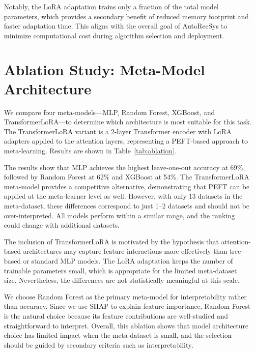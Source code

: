 \documentclass[conference]{IEEEtran}
\begin{document}
Notably, the LoRA adaptation trains only a fraction of the total model parameters, which provides a secondary benefit of reduced memory footprint and faster adaptation time. This aligns with the overall goal of AutoRecSys to minimize computational cost during algorithm selection and deployment.

\section{Ablation Study: Meta-Model Architecture}

We compare four meta-models---MLP, Random Forest, XGBoost, and TransformerLoRA---to determine which architecture is most suitable for this task. The TransformerLoRA variant is a 2-layer Transformer encoder with LoRA adapters \cite{hu2022lora} applied to the attention layers, representing a PEFT-based approach to meta-learning. Results are shown in Table~\ref{tab:ablation}.



The results show that MLP achieves the highest leave-one-out accuracy at 69\%, followed by Random Forest at 62\% and XGBoost at 54\%. The TransformerLoRA meta-model provides a competitive alternative, demonstrating that PEFT can be applied at the meta-learner level as well. However, with only 13 datasets in the meta-dataset, these differences correspond to just 1--2 datasets and should not be over-interpreted. All models perform within a similar range, and the ranking could change with additional datasets.

The inclusion of TransformerLoRA is motivated by the hypothesis that attention-based architectures may capture feature interactions more effectively than tree-based or standard MLP models. The LoRA adaptation keeps the number of trainable parameters small, which is appropriate for the limited meta-dataset size. Nevertheless, the differences are not statistically meaningful at this scale.

We choose Random Forest as the primary meta-model for interpretability rather than accuracy. Since we use SHAP \cite{lundberg2017shap} to explain feature importance, Random Forest is the natural choice because its feature contributions are well-studied and straightforward to interpret. Overall, this ablation shows that model architecture choice has limited impact when the meta-dataset is small, and the selection should be guided by secondary criteria such as interpretability.
\end{document}
